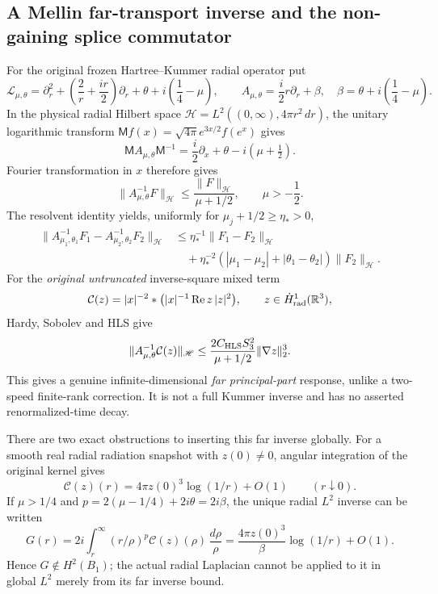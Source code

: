 \subsection*{A Mellin far-transport inverse and the non-gaining splice commutator}
For the original frozen Hartree--Kummer radial operator put
\[
\mathcal L_{\mu,\theta}=\partial_r^2+
 \left(\frac2r+\frac{ir}{2}\right)\partial_r+
 \theta+i\left(\frac14-\mu\right),\qquad
 A_{\mu,\theta}=\frac i2r\partial_r+\beta,\quad
 \beta=\theta+i\left(\frac14-\mu\right).
\]
In the physical radial Hilbert space
\(\mathscr H=L^2((0,\infty),4\pi r^2\,dr)\), the unitary logarithmic
transform \(\mathsf Mf(x)=\sqrt{4\pi}e^{3x/2}f(e^x)\) gives
\[
 \mathsf MA_{\mu,\theta}\mathsf M^{-1}
 =\frac i2\partial_x+\theta-i(\mu+\tfrac12).
\]
Fourier transformation in \(x\) therefore gives
\[
 \|A_{\mu,\theta}^{-1}F\|_{\mathscr H}
 \le\frac{\|F\|_{\mathscr H}}{\mu+1/2},
 \qquad \mu>-\frac12.
\]
The resolvent identity yields, uniformly for \(\mu_j+1/2\ge\eta_*>0\),
\[
\begin{aligned}
\|A_{\mu_1,\theta_1}^{-1}F_1-A_{\mu_2,\theta_2}^{-1}F_2\|_{\mathscr H}
&\le\eta_*^{-1}\|F_1-F_2\|_{\mathscr H}\\
&\quad+\eta_*^{-2}(|\mu_1-\mu_2|+|\theta_1-\theta_2|)
\|F_2\|_{\mathscr H}.
\end{aligned}
\]
For the \emph{original untruncated} inverse-square mixed term
\[
 \mathcal C(z)=|x|^{-2}*
 \bigl(|x|^{-1}\operatorname{Re}z\,|z|^2\bigr),
 \qquad z\in\dot H^1_{\rm rad}(\mathbb R^3),
\]
Hardy, Sobolev and HLS give
\[
 \|A_{\mu,\theta}^{-1}\mathcal C(z)\|_{\mathscr H}
 \le\frac{2C_{\rm HLS}S_3^2}{\mu+1/2}\|\nabla z\|_2^3.
\]
This gives a genuine infinite-dimensional \emph{far principal-part}
response, unlike a two-speed finite-rank correction. It is not a
full Kummer inverse and has no asserted renormalized-time decay.

There are two exact obstructions to inserting this far inverse
globally. For a smooth real radial radiation snapshot with \(z(0)\ne0\),
angular integration of the original kernel gives
\[
 \mathcal C(z)(r)=4\pi z(0)^3\log(1/r)+O(1)\qquad(r\downarrow0).
\]
If \(\mu>1/4\) and \(p=2(\mu-1/4)+2i\theta=2i\beta\),
the unique radial \(L^2\) inverse can be written
\[
 G(r)=2i\int_r^\infty(r/\rho)^p\mathcal C(z)(\rho)
 \,\frac{d\rho}{\rho}
 =\frac{4\pi z(0)^3}{\beta}\log(1/r)+O(1).
\]
Hence \(G\notin H^2(B_1)\); the actual radial Laplacian cannot
be applied to it in global \(L^2\) merely from its far inverse bound.

